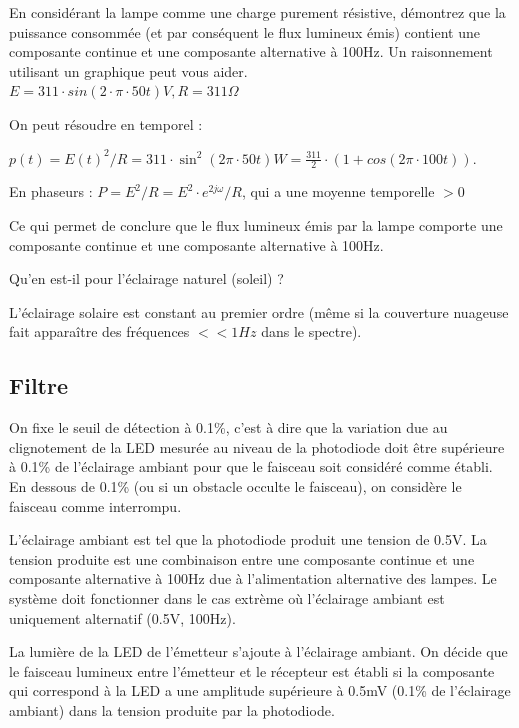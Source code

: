 \documentclass{../template/tp}
\begin{document}
 \Question
 {
 En considérant la lampe comme une charge purement résistive, démontrez que la puissance consommée (et par conséquent le flux lumineux émis) contient une composante continue et une composante alternative à 100Hz. Un raisonnement utilisant un graphique peut vous aider.\\
 $E=311 \cdot sin(2\cdot\pi\cdot50t) V, R=311\Omega$

 }
 {%
 On peut résoudre en temporel :%
 
 $p(t)=E(t)^2/R=311\cdot\sin^2(2\pi\cdot50t) W=\frac{311}{2}\cdot(1+cos(2\pi\cdot100t))$.

En phaseurs :
 $P=E^2/R=E^2\cdot e^{2j\omega}/R$, qui a une moyenne temporelle $>0$

 Ce qui permet de conclure que le flux lumineux émis par la lampe comporte une composante continue et une composante alternative à 100Hz.
 }
\enlargethispage{0.5cm}
 \Question
 {
 Qu'en est-il pour l'éclairage naturel (soleil) ?

 }
 {%
 L'éclairage solaire est constant au premier ordre (même si la couverture nuageuse fait apparaître des fréquences $<<1Hz$ dans le spectre).
 }
 
\subsection{Filtre}
On fixe le seuil de détection à 0.1\%, c'est à dire que la variation due au clignotement de la LED mesurée au niveau de la photodiode doit être supérieure à 0.1\% de l'éclairage ambiant pour que le faisceau soit considéré comme établi. En dessous de 0.1\% (ou si un obstacle occulte le faisceau), on considère le faisceau comme interrompu.

L'éclairage ambiant est tel que la photodiode produit une tension de 0.5V. La tension produite est une combinaison entre une composante continue et une composante alternative à 100Hz due à l'alimentation alternative des lampes. Le système doit fonctionner dans le cas extrème où l'éclairage ambiant est uniquement alternatif (0.5V, 100Hz).

La lumière de la LED de l'émetteur s'ajoute à l'éclairage ambiant. On décide que le faisceau lumineux entre l'émetteur et le récepteur est établi si la composante qui correspond à la LED a une amplitude supérieure à 0.5mV (0.1\% de l'éclairage ambiant) dans la tension produite par la photodiode.
\end{document}
